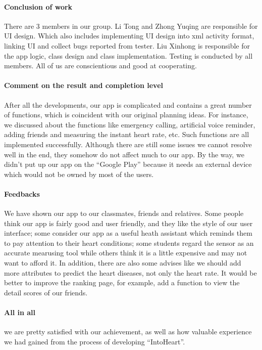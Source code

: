 \paragraph{Conclusion of work}
There are 3 members in our group. Li Tong and Zhong Yuqing are responsible for UI design. Which also includes implementing UI design into xml activity format, linking UI and collect bugs reported from tester. Liu Xinhong is responsible for the app logic, class design and class implementation. Testing is conducted by all members.  All of us are conscientious and good at cooperating. 
                                
\paragraph{Comment on the result and completion level}
After all the developments, our app is complicated and contains a great number of functions, which is coincident with our original planning ideas. For instance, we discussed about the functions like emergency calling, artificial voice reminder, adding friends and measuring the instant heart rate, etc. Such functions are all implemented successfully. Although there are still some issues we cannot resolve well in the end,  they somehow do not affect much to our app. By the way, we didn’t put up our app on the “Google Play” because it needs an external device which would not be owned by most of the users.  
 
\paragraph{Feedbacks}
We have shown our app to our classmates, friends and relatives. Some people think our app is fairly good and user friendly, and they like the style of our user interface; some consider our app as a useful heath assistant which reminds them to pay attention to their heart conditions; some students regard the sensor as an accurate mearusing tool while others think it is a little expensive and may not want to afford it. In addition, there are also some advises like we should add more attributes to predict the heart diseases, not only the heart rate. It would be better to improve the ranking page, for example, add a function to view the detail scores of our friends. 

\paragraph{All in all} we are pretty satisfied with our achievement, as well as how valuable experience we had gained from the process of developing “IntoHeart”. 

